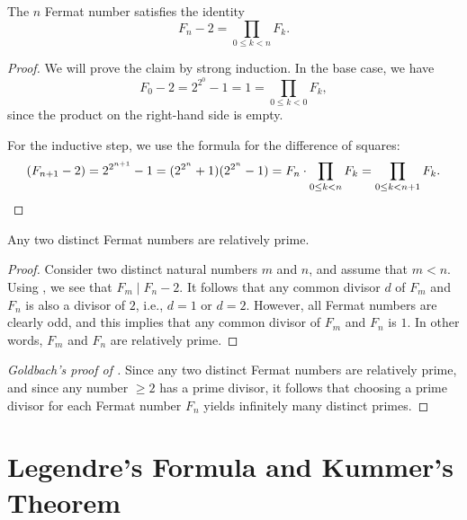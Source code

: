 \begin{theorem}\label{theorem:product-formula-fermat-numbers}
  The $n$\supth{} Fermat number satisfies the identity
  \begin{equation*}
    F_n - 2 = \prod_{0\leq k<n}F_k.
  \end{equation*}
\end{theorem}

\begin{proof}
  We will prove the claim by strong induction. In the base case, we have
  \begin{equation*}
    F_0-2 = 2^{2^0}-1=1=\prod_{0\leq k<0}F_k,
  \end{equation*}
  since the product on the right-hand side is empty.

  For the inductive step, we use the formula for the difference of squares:
  \begin{equation*}
    (F_{n+1}-2)=2^{2^{n+1}}-1=(2^{2^n}+1)(2^{2^n}-1)=F_n \cdot \prod_{0\leq k<n}F_k= \prod_{0\leq k<n+1}F_k.\qedhere
  \end{equation*}
\end{proof}

\begin{theorem}\label{theorem:goldbachs-theorem}
  Any two distinct Fermat numbers are relatively prime.
\end{theorem}

\begin{proof}
  Consider two distinct natural numbers $m$ and $n$, and assume that $m<n$. Using , we see that $F_m \mid F_n - 2$. It follows that any common divisor $d$ of $F_m$ and $F_n$ is also a divisor of $2$, i.e., $d=1$ or $d=2$. However, all Fermat numbers are clearly odd, and this implies that any common divisor of $F_m$ and $F_n$ is $1$. In other words, $F_m$ and $F_n$ are relatively prime.
\end{proof}

\begin{proof}[Goldbach's proof of ]
  Since any two distinct Fermat numbers are relatively prime, and since any number $\geq 2$ has a prime divisor, it follows that choosing a prime divisor for each Fermat number $F_n$ yields infinitely many distinct primes.
\end{proof}

\section{Legendre's Formula and Kummer's Theorem}

